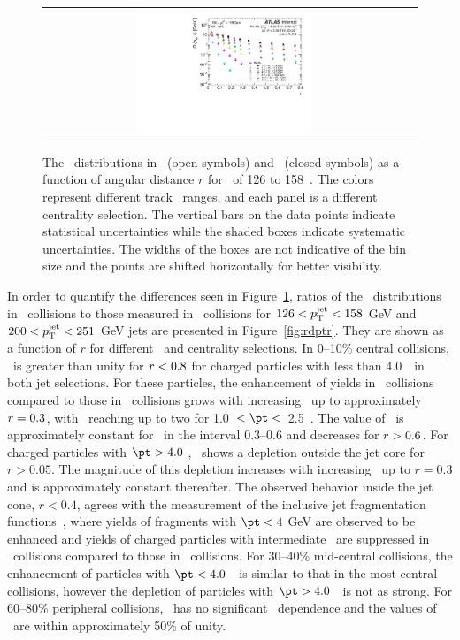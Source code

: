 \begin{figure}[h]
{\begin{tabular}{cc}
            \includegraphics[width=0.5\textwidth]{figures/results/DpT_dR_jet7_cent5.pdf} \\
      \end{tabular}
      }
\caption{The \Dptr\ distributions in \pp\ (open symbols) and \pbpb\ (closed symbols) as a function of angular distance $r$ for \ptjet\ of 126 to 158~\GeV. The colors represent different track \pt\ ranges, and each panel is a different centrality selection. The vertical bars on the data points indicate statistical uncertainties while the shaded boxes indicate systematic uncertainties. The widths of the boxes are not indicative of the bin size and the points are shifted horizontally for better visibility.}
\label{fig:dptr}
\end{figure}


In order to quantify the differences seen in Figure~\ref{fig:dptr}, ratios of the \Dptr\ distributions in \pbpb\ collisions
to those measured in \pp\ collisions for $126 < \mbox{$p_{\mathrm{T}}^{\mathrm{jet}}$} < 158$ GeV and $200 < \mbox{$p_{\mathrm{T}}^{\mathrm{jet}}$} < 251$ GeV jets 
are presented in Figure~\ref{fig:rdptr}. They are shown as a function of $r$ for different \pt\ and centrality selections. In 0--10\% central collisions,
\RDptr\ is greater than unity for $\mbox{$r$} < 0.8$ for charged particles with \pT less than 4.0~\GeV\ in both jet selections. 
For these particles, the enhancement of yields in \pbpb\ collisions compared to those in  \pp\ 
collisions grows with increasing \rvar\ up to approximately \mbox{$\mbox{$r$}  = 0.3$}, with \RDptr\ reaching up to two for
1.0~$< \pt <$~2.5~\GeV.
The value of \RDptr\ is approximately constant for \rvar\ in the interval \mbox{0.3--0.6} and decreases for \mbox{$\mbox{$r$} > 0.6$}.  For charged particles with $\pt > 4.0$ \GeV, \RDptr\ shows a depletion outside the jet core for $r > 0.05$. The magnitude of this depletion increases with increasing \rvar\ up to $r = 0.3$ and is approximately constant thereafter.
 The observed behavior inside the jet cone, $r < 0.4$, agrees with the measurement of the inclusive jet fragmentation functions~\cite{Aaboud:2017eww,Aaboud:2017bzv, Aaboud:2018hpb}, where yields of fragments with $\pt < 4$ GeV are observed to be enhanced and yields of charged particles with intermediate \pT\ are suppressed in \PbPb\ collisions compared to those in \pp\ collisions. 
 For 30--40\% mid-central collisions, the enhancement of particles with $\pt < 4.0$~\GeV\ is similar to that in the most central 
 collisions, however the depletion of particles with $\pt > 4.0$~\GeV\ is not as strong.
For 60--80\% peripheral collisions, \RDptr\ has no significant \rvar\ dependence and the values of \RDptr\ are within approximately 50\% of unity.

